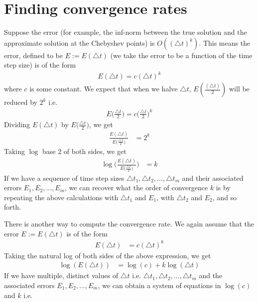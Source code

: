 \documentclass[12pt]{article}
\begin{document}
\section*{Finding convergence rates}
Suppose the error (for example, the inf-norm between the true solution and the approximate solution at the Chebyshev points) is $O((\triangle t)^k)$.
This means the error, defined to be $E := E(\triangle t)$ (we take the error to be a function of the time step size) is of the form
\begin{align*}
	E(\triangle t) = c (\triangle t)^{k}
\end{align*}
where $c$ is some constant.
We expect that when we halve $\triangle t$, $E(\frac{(\triangle t)}{2})$ will be reduced by $2^{k}$ i.e.
\begin{align*}
	E\Big( \frac{\triangle t}{2} \Big) = c \Big( \frac{\triangle t}{2} \Big)^{k}
\end{align*}
Dividing $E(\triangle t)$ by $E \Big( \frac{\triangle t}{2} \Big)$, we get
\begin{align*}
	\frac{ E (\triangle t) }{ E \Big( \frac{\triangle t}{2} \Big) } & = 2^{k}
\end{align*}
Taking $\log$ base $2$ of both sides, we get
\begin{align*}
	\log \Bigg( \frac{ E (\triangle t) }{ E \Big( \frac{\triangle t}{2} \Big) } \Bigg) & = k
\end{align*}
If we have a sequence of time step sizes $\triangle t_{1}, \triangle t_{2}, \hdots, \triangle t_{m}$ and their associated errors $E_{1}, E_{2}, \hdots, E_{m}$, we can recover what the order of convergence $k$ is by repeating the above calculations with $\triangle t_{1}$ and $E_{1}$, with $\triangle t_{2}$ and $E_{2}$, and so forth.
\par 
There is another way to compute the convergence rate.
We again assume that the error $E := E(\triangle t)$ is of the form
\begin{align*}
	E(\triangle t) & = c (\triangle t)^{k}
\end{align*}
Taking the natural log of both sides of the above expression, we get
\begin{align*}
	\log (E(\triangle t)) & = \log(c) + k \log(\triangle t)
\end{align*}
If we have multiple, distinct values of $\triangle t$ i.e. $\triangle t_{1}, \triangle t_{2}, \hdots, \triangle t_{m}$ and the associated errors $E_{1}, E_{2}, \hdots, E_{m}$, we can obtain a system of equations in $\log(c)$ and $k$ i.e.
\end{document}

